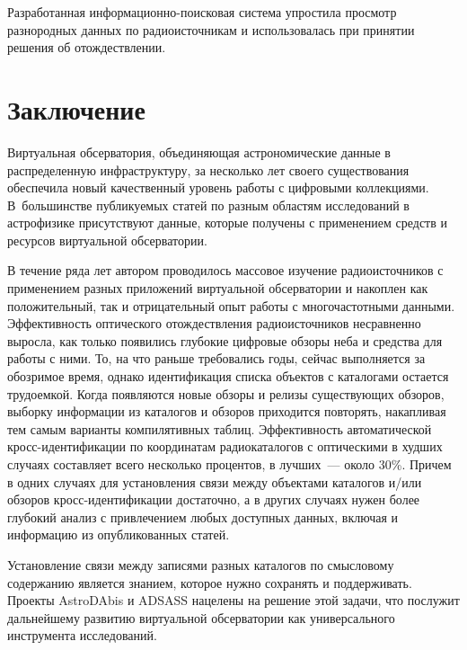 \begin{multicols}{2}
      Разработанная ин\-фор\-ма\-ци\-он\-но-по\-иско\-вая сис\-те\-ма упростила просмотр 
разнородных данных по радиоисточникам и использовалась при принятии решения об 
отождествлении.
  
\section{Заключение}

      Виртуальная обсерватория, объединяющая астрономические данные в 
распределенную инфраструктуру, за несколько лет своего существования обеспечила новый 
качественный уровень работы с цифровыми коллекциями. В~большинстве публикуемых 
статей по разным областям исследований в астрофизике присутствуют данные, которые 
получены с применением средств и ресурсов виртуальной обсерватории. 
      
      В течение ряда лет автором проводилось массовое изучение радиоисточников с 
применением разных приложений виртуальной обсерватории и накоплен как 
положительный, так и отрицательный опыт работы с многочастотными данными. 
Эффективность оптического отождествления радиоисточников несравненно выросла, как 
только появились глубокие цифровые обзоры неба и средства для работы с ними. То, на что 
раньше требовались годы, сейчас выполняется за обозримое время, однако идентификация 
списка объектов с каталогами остается трудоемкой. Когда появляются новые обзоры и 
релизы существующих обзоров, выборку информации из каталогов и обзоров приходится 
повторять, накапливая тем самым варианты компилятивных таблиц. Эффективность 
автоматической кросс-иден\-ти\-фи\-ка\-ции по координатам радиокаталогов с оптическими 
в худших случаях составляет всего несколько процентов, в лучших~--- около 30\%. Причем в 
одних случаях для установления связи между объектами каталогов и/или обзоров 
      кросс-иден\-ти\-фи\-ка\-ции достаточно, а в других случаях нужен более глубокий 
анализ с привлечением любых доступных данных, включая и информацию из 
опубликованных статей. 
      
      Установление связи между записями разных каталогов по смысловому содержанию 
является знанием, которое нужно сохранять и поддерживать. Проекты AstroDAbis и 
ADSASS нацелены на решение этой задачи, что послужит дальнейшему развитию 
виртуальной обсерватории как универсального инструмента исследований.
     
{\small\frenchspacing
{%
\begin{thebibliography}{99}


\end{thebibliography}}}
\end{multicols}
